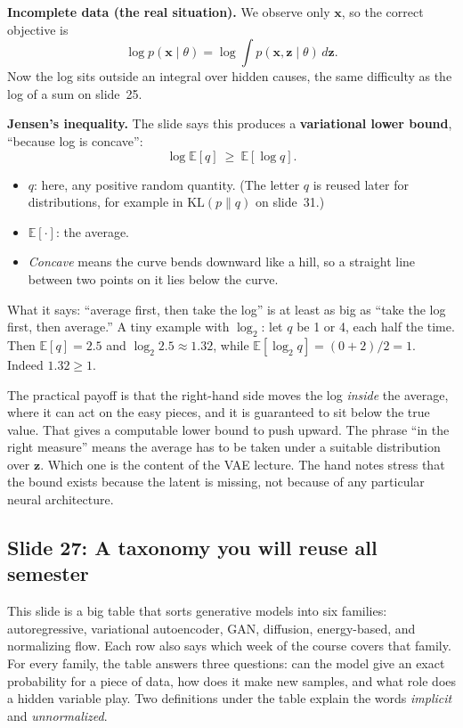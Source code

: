 \textbf{Incomplete data (the real situation).} We observe only $\mathbf{x}$, so the correct objective is
\[
\log p(\mathbf{x}\mid\theta)=\log\int p(\mathbf{x},\mathbf{z}\mid\theta)\,d\mathbf{z}.
\]
Now the log sits outside an integral over hidden causes, the same difficulty as the log of a sum on slide~25.

\textbf{Jensen's inequality.} The slide says this produces a \textbf{variational lower bound}, ``because log is concave'':
\[
\log\mathbb{E}[q]\ \ge\ \mathbb{E}[\log q].
\]
\begin{itemize}
\item $q$: here, any positive random quantity. (The letter $q$ is reused later for distributions, for example in $\mathrm{KL}(p\|q)$ on slide~31.)
\item $\mathbb{E}[\cdot]$: the average.
\item \textit{Concave} means the curve bends downward like a hill, so a straight line between two points on it lies below the curve.
\end{itemize}
What it says: ``average first, then take the log'' is at least as big as ``take the log first, then average.'' A tiny example with $\log_2$: let $q$ be 1 or 4, each half the time. Then $\mathbb{E}[q]=2.5$ and $\log_2 2.5\approx1.32$, while $\mathbb{E}[\log_2 q]=(0+2)/2=1$. Indeed $1.32\ge1$.

The practical payoff is that the right-hand side moves the log \textit{inside} the average, where it can act on the easy pieces, and it is guaranteed to sit below the true value. That gives a computable lower bound to push upward. The phrase ``in the right measure'' means the average has to be taken under a suitable distribution over $\mathbf{z}$. Which one is the content of the VAE lecture. The hand notes stress that the bound exists because the latent is missing, not because of any particular neural architecture.

\subsection*{Slide 27: A taxonomy you will reuse all semester}

This slide is a big table that sorts generative models into six families: autoregressive, variational autoencoder, GAN, diffusion, energy-based, and normalizing flow. Each row also says which week of the course covers that family. For every family, the table answers three questions: can the model give an exact probability for a piece of data, how does it make new samples, and what role does a hidden variable play. Two definitions under the table explain the words \textit{implicit} and \textit{unnormalized}.

